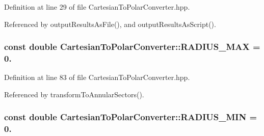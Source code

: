\-Definition at line 29 of file \-Cartesian\-To\-Polar\-Converter.\-hpp.



\-Referenced by output\-Results\-As\-File(), and output\-Results\-As\-Script().

\hypertarget{classmultiscale_1_1video_1_1CartesianToPolarConverter_a79bb03defe0d68884ce5d4f1b0a7d60c}{
\subsubsection[{\-R\-A\-D\-I\-U\-S\-\_\-\-M\-A\-X}]{\setlength{\rightskip}{0pt plus 5cm}const double {\bf \-Cartesian\-To\-Polar\-Converter\-::\-R\-A\-D\-I\-U\-S\-\_\-\-M\-A\-X} = 0.}}\label{classmultiscale_1_1video_1_1CartesianToPolarConverter_a79bb03defe0d68884ce5d4f1b0a7d60c}


\-Definition at line 83 of file \-Cartesian\-To\-Polar\-Converter.\-hpp.



\-Referenced by transform\-To\-Annular\-Sectors().

\hypertarget{classmultiscale_1_1video_1_1CartesianToPolarConverter_a59c18c22603ad65bf26533dd2aafd04e}{
\subsubsection[{\-R\-A\-D\-I\-U\-S\-\_\-\-M\-I\-N}]{\setlength{\rightskip}{0pt plus 5cm}const double {\bf \-Cartesian\-To\-Polar\-Converter\-::\-R\-A\-D\-I\-U\-S\-\_\-\-M\-I\-N} = 0.}}\label{classmultiscale_1_1video_1_1CartesianToPolarConverter_a59c18c22603ad65bf26533dd2aafd04e}


